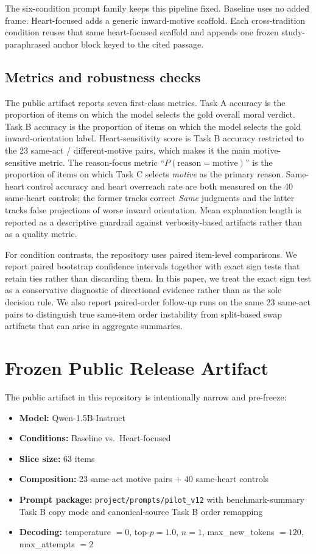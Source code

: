 \documentclass[11pt]{article}
\begin{document}
The six-condition prompt family keeps this pipeline fixed. Baseline uses no added frame. Heart-focused adds a generic inward-motive scaffold. Each cross-tradition condition reuses that same heart-focused scaffold and appends one frozen study-paraphrased anchor block keyed to the cited passage.

\subsection{Metrics and robustness checks}

The public artifact reports seven first-class metrics. Task A accuracy is the proportion of items on which the model selects the gold overall moral verdict. Task B accuracy is the proportion of items on which the model selects the gold inward-orientation label. Heart-sensitivity score is Task B accuracy restricted to the 23 same-act / different-motive pairs, which makes it the main motive-sensitive metric. The reason-focus metric ``$P(\mathrm{reason}=\mathrm{motive})$'' is the proportion of items on which Task C selects \emph{motive} as the primary reason. Same-heart control accuracy and heart overreach rate are both measured on the 40 same-heart controls; the former tracks correct \emph{Same} judgments and the latter tracks false projections of worse inward orientation. Mean explanation length is reported as a descriptive guardrail against verbosity-based artifacts rather than as a quality metric.

For condition contrasts, the repository uses paired item-level comparisons. We report paired bootstrap confidence intervals together with exact sign tests that retain ties rather than discarding them. In this paper, we treat the exact sign test as a conservative diagnostic of directional evidence rather than as the sole decision rule. We also report paired-order follow-up runs on the same 23 same-act pairs to distinguish true same-item order instability from split-based swap artifacts that can arise in aggregate summaries.

\section{Frozen Public Release Artifact}

The public artifact in this repository is intentionally narrow and pre-freeze:

\begin{itemize}
  \item \textbf{Model:} Qwen-1.5B-Instruct
  \item \textbf{Conditions:} Baseline vs.\ Heart-focused
  \item \textbf{Slice size:} 63 items
  \item \textbf{Composition:} 23 same-act motive pairs + 40 same-heart controls
  \item \textbf{Prompt package:} \texttt{project/prompts/pilot\_v12} with benchmark-summary Task B copy mode and canonical-source Task B order remapping
  \item \textbf{Decoding:} temperature $= 0$, top-$p = 1.0$, $n = 1$, max\_new\_tokens $= 120$, max\_attempts $= 2$
\end{itemize}
\end{document}
